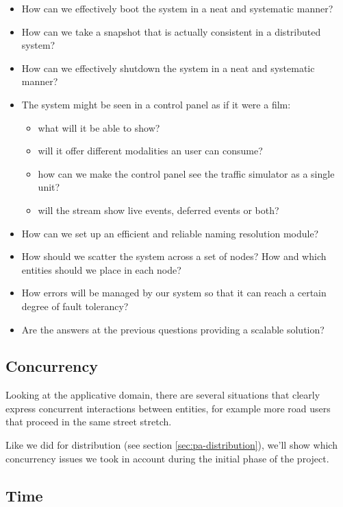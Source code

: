 \begin{itemize}
\item How can we effectively boot the system in a neat and systematic manner?
\item How can we take a snapshot that is actually consistent in a distributed
  system?
\item How can we effectively shutdown the system in a neat and systematic
  manner?
\item The system might be seen in a control panel as if it were a film:
  \begin{itemize}
  \item what will it be able to show?
  \item will it offer different modalities an user can consume?
  \item how can we make the control panel see the traffic simulator as a
    single unit?
  \item will the stream show live events, deferred events or both?
  \end{itemize}
\item How can we set up an efficient and reliable naming resolution module?
\item How should we scatter the system across a set of nodes? How and which
  entities should we place in each node?
\item How errors will be managed by our system so that it can reach a certain
  degree of fault tolerancy?
\item Are the answers at the previous questions providing a scalable solution?
\end{itemize}

\subsection{Concurrency}
Looking at the applicative domain, there are several situations that clearly
express concurrent interactions between entities, for example more road users
that proceed in the same street stretch.

Like we did for distribution (see section \ref{sec:pa-distribution}), we'll
show which concurrency issues we took in account during the initial phase of
the project.

\subsection{Time}

